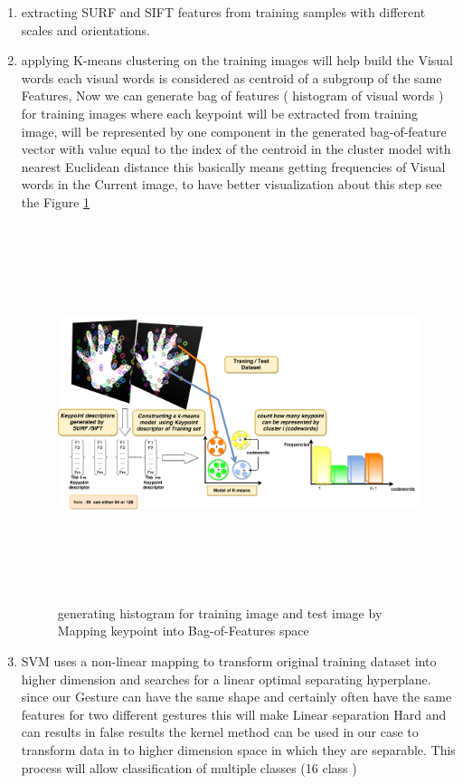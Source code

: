 \begin{enumerate}
 \item extracting SURF and SIFT features from training samples with different scales and  orientations.
 \item applying  K-means clustering on the training images will help build the Visual words each visual words is considered as centroid of a subgroup of the same Features, Now we can generate bag of features ( histogram of visual words ) for training images where each keypoint will be extracted from training image, will be represented by one component in the generated bag-of-feature vector with value equal to the index of the centroid in the cluster model with nearest Euclidean
distance this basically means getting frequencies of Visual words in the Current image, to have better visualization  about this step see the Figure \ref{fig:histo}

\begin{figure}[H]
\centering
\includegraphics[width=18.5cm, height=11cm ]{img/bow/transparantnewhistogram.pdf}
\caption{ generating histogram for training image and test image by Mapping keypoint into Bag-of-Features space }
\label{fig:histo}
\end{figure}

\item SVM uses a non-linear mapping to transform original training dataset into higher dimension and searches for a linear optimal
separating hyperplane. since our Gesture can have the same shape and certainly often have the same features for two different gestures  this will make Linear separation Hard and can results in false results the kernel method can be used in our case  to transform data  in to higher dimension space in which they are separable. This process will allow classification of multiple classes (16 class ) 
\end{enumerate}


